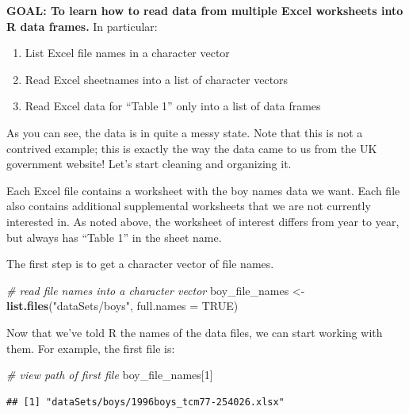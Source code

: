 \documentclass[
]{book}
\newenvironment{Shaded}{\begin{snugshade}}{\end{snugshade}}
\newcommand{\CommentTok}[1]{\textcolor[rgb]{0.56,0.35,0.01}{\textit{#1}}}
\newcommand{\DataTypeTok}[1]{\textcolor[rgb]{0.13,0.29,0.53}{#1}}
\newcommand{\DecValTok}[1]{\textcolor[rgb]{0.00,0.00,0.81}{#1}}
\newcommand{\KeywordTok}[1]{\textcolor[rgb]{0.13,0.29,0.53}{\textbf{#1}}}
\newcommand{\NormalTok}[1]{#1}
\newcommand{\OtherTok}[1]{\textcolor[rgb]{0.56,0.35,0.01}{#1}}
\newcommand{\StringTok}[1]{\textcolor[rgb]{0.31,0.60,0.02}{#1}}
\providecommand{\tightlist}{%
  \setlength{\itemsep}{0pt}\setlength{\parskip}{0pt}}
\begin{document}
\begin{alert}

\textbf{GOAL: To learn how to read data from multiple Excel worksheets into R data frames.} In particular:

\begin{enumerate}
\def\labelenumi{\arabic{enumi}.}
\tightlist
\item
  List Excel file names in a character vector
\item
  Read Excel sheetnames into a list of character vectors
\item
  Read Excel data for ``Table 1'' only into a list of data frames
\end{enumerate}

\end{alert}

As you can see, the data is in quite a messy state. Note that this is not a contrived example; this is exactly the way the data came to us from the UK government website! Let's start cleaning and organizing it.

Each Excel file contains a worksheet with the boy names data we want. Each file also contains additional supplemental worksheets that we are not currently interested in. As noted above, the worksheet of interest differs from year to year, but always has ``Table 1'' in the sheet name.

The first step is to get a character vector of file names.

\begin{Shaded}
\begin{Highlighting}[]
\CommentTok{\# read file names into a character vector}
\NormalTok{boy\_file\_names \textless{}{-}}\StringTok{ }\KeywordTok{list.files}\NormalTok{(}\StringTok{"dataSets/boys"}\NormalTok{, }\DataTypeTok{full.names =} \OtherTok{TRUE}\NormalTok{)}
\end{Highlighting}
\end{Shaded}

Now that we've told R the names of the data files, we can start working with them. For example, the first file is:

\begin{Shaded}
\begin{Highlighting}[]
\CommentTok{\# view path of first file}
\NormalTok{boy\_file\_names[}\DecValTok{1}\NormalTok{]}
\end{Highlighting}
\end{Shaded}

\begin{verbatim}
## [1] "dataSets/boys/1996boys_tcm77-254026.xlsx"
\end{verbatim}
\end{document}
